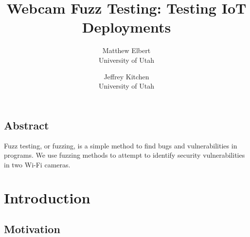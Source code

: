 \documentclass[letterpaper,twocolumn,10pt]{article}
\begin{document}
\date{}

\title{\Large \bf Webcam Fuzz Testing: Testing IoT Deployments}

\author{
{\rm Matthew Elbert}\\
University of Utah
\and
{\rm Jeffrey Kitchen}\\
University of Utah
} %

\maketitle

\thispagestyle{empty}


\subsection*{Abstract}
Fuzz testing, or fuzzing, is a simple method to find bugs and vulnerabilities in programs. We use fuzzing methods to attempt to identify security vulnerabilities in two Wi-Fi cameras. 

\section{Introduction}
\subsection{Motivation}
\end{document}
